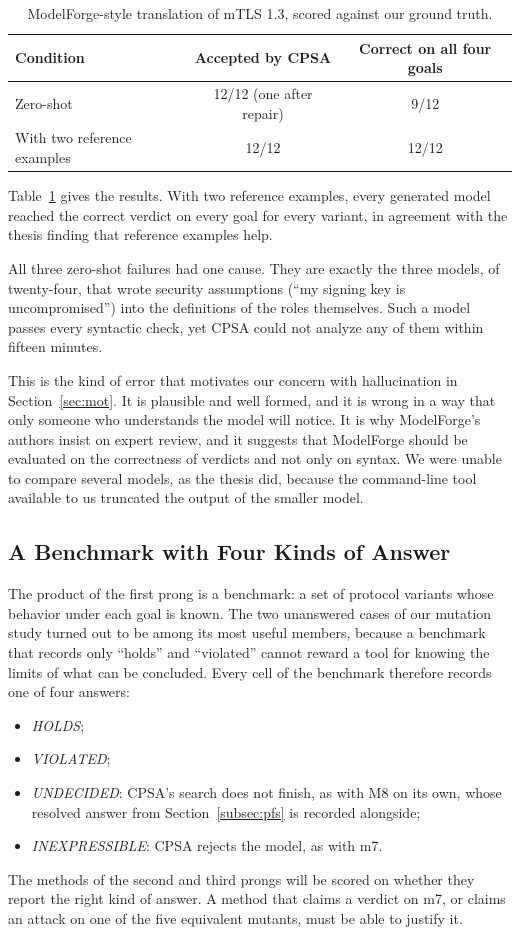 \documentclass[11pt]{article}
\begin{document}
\begin{table}[h!]
\centering
\small
\begin{tabular}{|l|c|c|}
\hline
\textbf{Condition} & \textbf{Accepted by CPSA} & \textbf{Correct on all four goals} \\
\hline
Zero-shot & 12/12 (one after repair) & 9/12 \\
With two reference examples & 12/12 & 12/12 \\
\hline
\end{tabular}
\caption{ModelForge-style translation of mTLS 1.3, scored against our ground truth.}
\label{tab:modelforge}
\end{table}

Table~\ref{tab:modelforge} gives the results. With two reference examples, every generated model reached the correct verdict on every goal for every variant, in agreement with the thesis finding that reference examples help.

All three zero-shot failures had one cause. They are exactly the three models, of twenty-four, that wrote security assumptions (``my signing key is uncompromised'') into the definitions of the roles themselves. Such a model passes every syntactic check, yet CPSA could not analyze any of them within fifteen minutes.

This is the kind of error that motivates our concern with hallucination in Section~\ref{sec:mot}. It is plausible and well formed, and it is wrong in a way that only someone who understands the model will notice. It is why ModelForge's authors insist on expert review, and it suggests that ModelForge should be evaluated on the correctness of verdicts and not only on syntax. We were unable to compare several models, as the thesis did, because the command-line tool available to us truncated the output of the smaller model.

\subsection{A Benchmark with Four Kinds of Answer}
\label{subsec:benchmark}
The product of the first prong is a benchmark: a set of protocol variants whose behavior under each goal is known. The two unanswered cases of our mutation study turned out to be among its most useful members, because a benchmark that records only ``holds'' and ``violated'' cannot reward a tool for knowing the limits of what can be concluded. Every cell of the benchmark therefore records one of four answers:
\begin{itemize}
    \item \textit{HOLDS};
    \item \textit{VIOLATED};
    \item \textit{UNDECIDED}: CPSA's search does not finish, as with M8 on its own, whose resolved answer from Section~\ref{subsec:pfs} is recorded alongside;
    \item \textit{INEXPRESSIBLE}: CPSA rejects the model, as with m7.
\end{itemize}
The methods of the second and third prongs will be scored on whether they report the right kind of answer. A method that claims a verdict on m7, or claims an attack on one of the five equivalent mutants, must be able to justify it.
\end{document}
